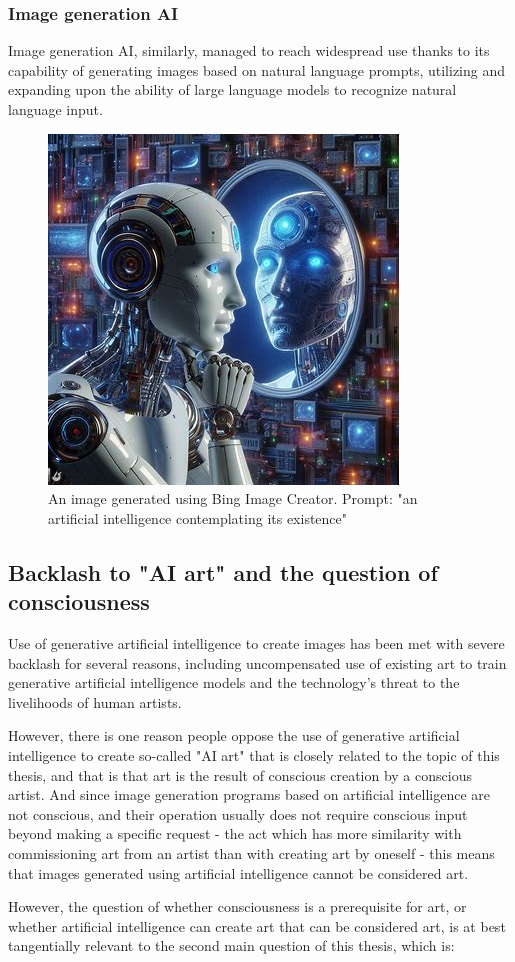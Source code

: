 \documentclass[masterthesis]{fer}
\begin{document}
\subsubsection{Image generation AI}
Image generation AI, similarly, managed to
reach widespread use thanks to its capability of
generating images based on natural language prompts,
utilizing and expanding upon the ability of
large language models to recognize natural
language input.
\begin{figure}[htb]
  \centering
  \includegraphics[width=0.38\linewidth]{Figures/bing image creator prompt 1a.jpeg} 
  \caption{An image generated using Bing Image Creator. Prompt: "an artificial intelligence contemplating its existence"}
  \label{slk:bing_image}
\end{figure}
\subsection{Backlash to "AI art" and the question of consciousness}
Use of generative artificial intelligence to
create images has been met with severe backlash
for several reasons, including uncompensated use
of existing art to train generative artificial
intelligence models and the technology's threat to the
livelihoods of human artists.

However, there is one reason people oppose the use of generative artificial intelligence to create so-called "AI art" that is closely related to the topic of this thesis, and that is that art is the result of conscious creation by a conscious artist. And since image generation programs based on artificial intelligence are not conscious, and their operation usually does not require conscious input beyond making a specific request - the act which has more similarity with commissioning art from an artist than with creating art by oneself - this means that images generated using artificial intelligence cannot be considered art.

However, the question of whether consciousness is a prerequisite for art, or whether artificial intelligence can create art that can be considered art, is at best tangentially relevant to the second main question of this thesis, which is:
\end{document}
